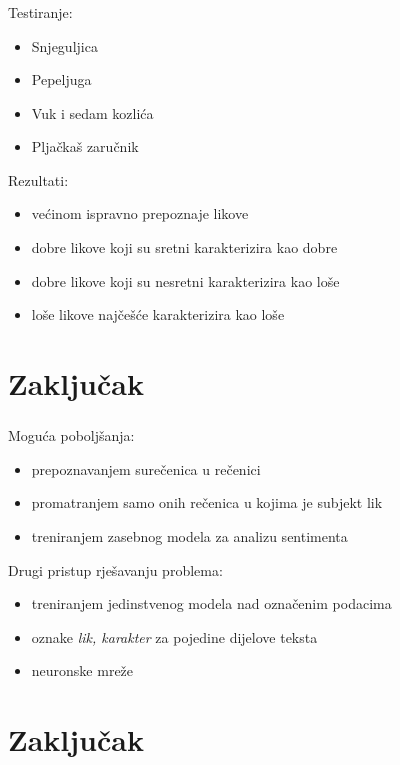 \documentclass[t, xcolor={usenames,dvipsnames,svgnames,table}]{beamer}
\begin{document}
	\begin{frame}
		\frametitle{\secname}
		
		Testiranje:
		\begin{itemize}
			\item	Snjeguljica
			\item 	Pepeljuga
			\item 	Vuk i sedam kozlića
			\item	Pljačkaš zaručnik
		\end{itemize}
		
		\bigskip
		
		Rezultati:
		\begin{itemize}
			\item 	većinom ispravno prepoznaje likove
			\item	dobre likove koji su sretni karakterizira kao dobre
			\item 	dobre likove koji su nesretni karakterizira kao loše
			\item 	loše likove najčešće karakterizira kao loše
		\end{itemize}
		
	\end{frame}

\section{Zaključak}
	
	\begin{frame}
		\sectionpage
	\end{frame}
	
	\begin{frame}
		\frametitle{\secname}
		
		Moguća poboljšanja:
		\begin{itemize}
			\item	prepoznavanjem surečenica u rečenici
			\item 	promatranjem samo onih rečenica u kojima je subjekt lik
			\item 	treniranjem zasebnog modela za analizu sentimenta
		\end{itemize}
		
		\bigskip
		
		Drugi pristup rješavanju problema:
		\begin{itemize}
			\item	treniranjem jedinstvenog modela nad označenim podacima
			\item	oznake \textit{lik, karakter} za pojedine dijelove teksta
			\item 	neuronske mreže
		\end{itemize}
		
	\end{frame}


\section{Zaključak}
\end{document}
